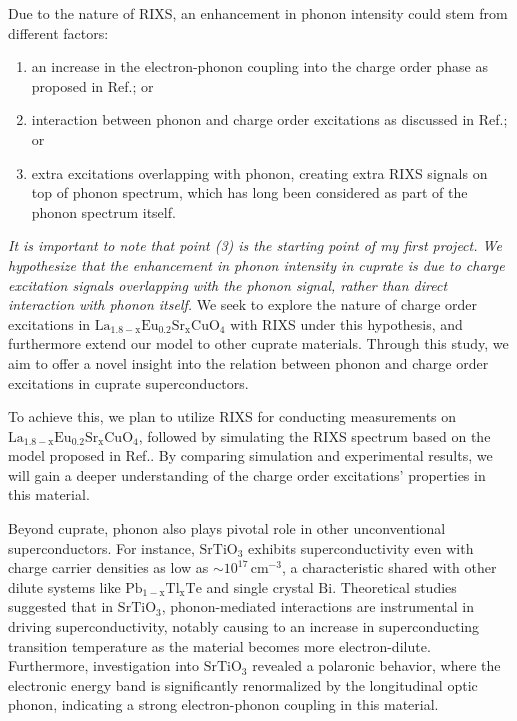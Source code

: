 \documentclass[11pt]{article}
\begin{document}
Due to the nature of RIXS, an enhancement in phonon intensity could stem from different factors: 
\begin{enumerate}
  \item an increase in the electron-phonon coupling into the charge order phase as proposed in Ref.\cite{wang_charge_2021,peng_electronic_2022}; or
  \item interaction between phonon and charge order excitations as discussed in Ref.\cite{li_multiorbital_2020, chaix_dispersive_2017,huang_quantum_2021}; or 
  \item extra excitations overlapping with phonon, creating extra RIXS signals on top of phonon spectrum, which has long been considered as part of the phonon spectrum itself. 
\end{enumerate}
\textit{It is important to note that point (3) is the starting point of my first project. We hypothesize that the enhancement in phonon intensity in cuprate is due to charge excitation signals overlapping with the phonon signal, rather than direct interaction with phonon itself.}  We seek to explore the nature of charge order excitations in $\mathrm{La_{1.8-x}Eu_{0.2}Sr_xCuO_{4}}$ with RIXS under this hypothesis, and furthermore extend our model to other cuprate materials. Through this study, we aim to offer a novel insight into the relation between phonon and charge order excitations in cuprate superconductors. 

To achieve this, we plan to utilize RIXS for conducting measurements on $\mathrm{La_{1.8-x}Eu_{0.2}Sr_xCuO_{4}}$, followed by simulating the RIXS spectrum based on the model proposed in Ref.\cite{devereaux_directly_2016}. By comparing simulation and experimental results, we will gain a deeper understanding of the charge order excitations' properties in this material. 

Beyond cuprate, phonon also plays pivotal role in other unconventional superconductors. For instance, $\mathrm{SrTiO_{3}}$ exhibits superconductivity even with charge carrier densities as low as $\sim 10^{17}\,\mathrm{cm^{-3}}$\cite{schooley_superconductivity_1964,lin_fermi_2013}, a characteristic shared with other dilute systems like $\mathrm{Pb_{1-x}Tl_{x}Te}$\cite{known} and single crystal $\mathrm{Bi}$\cite{prakash_evidence_2017}. Theoretical studies suggested that in $\mathrm{SrTiO_{3}}$, phonon-mediated interactions are instrumental in driving superconductivity, notably causing to an increase in superconducting transition temperature as the material becomes more electron-dilute\cite{gastiasoro_phonon-mediated_2019}. Furthermore, investigation into $\mathrm{SrTiO_{3}}$ revealed a polaronic behavior, where the electronic energy band is significantly renormalized by the longitudinal optic phonon, indicating a strong electron-phonon coupling in this material\cite{swartz_polaronic_2018}. 
\end{document}
